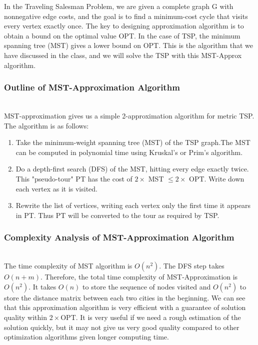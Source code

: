In the Traveling Salesman Problem, we are given a complete graph G with nonnegative edge costs, and the goal is to find a minimum-cost cycle that visits every vertex exactly once. The key to designing approximation algorithm is to obtain a bound on the optimal value OPT. In the case of TSP, the minimum spanning tree (MST) gives a lower bound on OPT. This is the algorithm that we have discussed in the class, and we will solve the TSP with this MST-Approx algorithm.\\


\subsubsection{Outline of MST-Approximation Algorithm}
\hfill\\
MST-approximation gives us a simple 2-approximation algorithm for metric TSP. The algorithm is as follows:
\begin{enumerate}
\item  Take the minimum-weight spanning tree (MST) of the TSP graph.The MST can be computed in polynomial time using Kruskal's or Prim's algorithm\cite{Tardos}.
\item Do a depth-first search (DFS) of the MST, hitting every edge exactly twice. This "pseudo-tour" PT has the cost of $2 \times$ MST $\leq 2 \times $ OPT. Write down each vertex as it is visited.
\item Rewrite the list of vertices, writing each vertex only the first time it appears in PT. Thus PT will be converted to the tour as required by TSP.

\end{enumerate}


\subsubsection{Complexity Analysis of MST-Approximation Algorithm}
\hfill\\
The time complexity of MST algorithm is $O(n^2)$. The DFS step takes $O(n+m)$. Therefore, the total time complexity of MST-Approximation is $O(n^2)$. It takes $O(n)$ to store the sequence of nodes visited and $O(n^2)$ to store the distance matrix between each two cities in the beginning. We can see that this approximation algorithm is very efficient with a guarantee of solution quality within $2\times$OPT. It is very useful if we need a rough estimation of the solution quickly, but it may not give us very good quality compared to other optimization algorithms given longer computing time.\\



